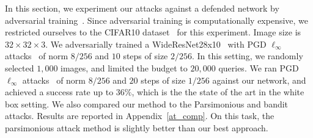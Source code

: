 In this section, we experiment our attacks against a defended network by adversarial training~\citep{goodfellow2014explaining}. Since adversarial training is computationally expensive, we restricted ourselves to the CIFAR10 dataset~\citep{krizhevsky2009cifar} for this experiment. Image size is $32\times32\times3$. We adversarially trained a WideResNet28x10~\citep{ZagoruykoK16} with PGD $\ell_\infty$ attacks~\citep{kurakin2016adversarial,madry2018towards} of norm $8/256$ and $10$ steps of size $2/256$. In this setting, we randomly selected $1,000$ images, and  limited the budget to $20,000$ queries. We ran PGD $\ell_\infty$ attacks~\citep{kurakin2016adversarial,madry2018towards} of norm $8/256$ and $20$ steps of size $1/256$ against our network, and achieved a success rate up to $36\%$, which is the the state of the art in the white box setting. We also compared our method to the Parsimonious and bandit attacks. Results are reported in Appendix~\ref{at_comp}. On this task, the parsimonious attack method is slightly better than our best approach.%

